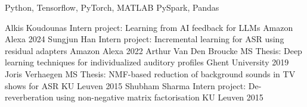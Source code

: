 \documentclass[]{awesome-cv}
\begin{document}
\begin{cvskills}
    { Python, Tensorflow, PyTorch, MATLAB}
    { PySpark, Pandas}
\end{cvskills}
\begin{cvhonors}
\cvhonor
    {Alkis Koudounas} %
    {Intern project: Learning from AI feedback for LLMs} %
    {Amazon Alexa}
    {2024} %
\cvhonor
    {Sungjun Han} %
    {Intern project: Incremental learning for ASR using residual adapters} %
    {Amazon Alexa}
    {2022} %
\cvhonor
    {Arthur Van Den Broucke} %
    {MS Thesis: Deep learning techniques for individualized auditory profiles} %
    {Ghent University}
    {2019} %
\cvhonor
    {Joris Verhaegen} %
    {MS Thesis: NMF-based reduction of background sounds in TV shows for ASR} %
    {KU Leuven}
    {2015} %
\cvhonor
    {Shubham Sharma} %
    {Intern project: De-reverberation using non-negative matrix factorisation} %
    {KU Leuven}
    {2015} %
\end{cvhonors}
\begin{cvskills}

\end{cvskills}
\end{document}
